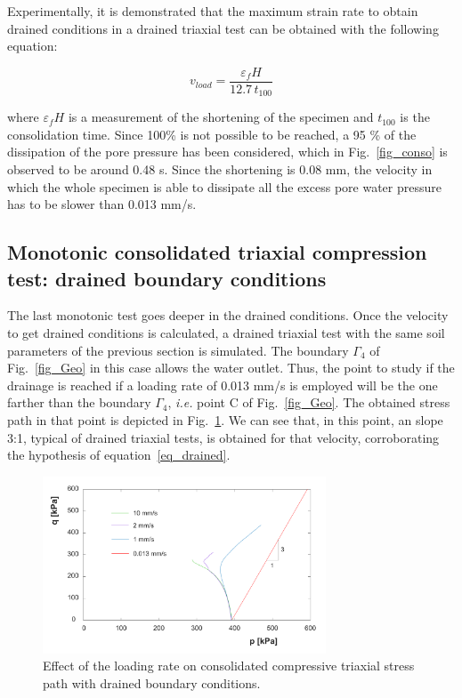 \documentclass[preprint,12pt,a4paper]{elsarticle}
\begin{document}
Experimentally, it is demonstrated that the maximum strain rate to obtain drained conditions in a drained triaxial test can be obtained with the following equation:

\begin{equation}
v_{load}=\frac{\varepsilon_f H}{12.7 \, t_{100}}
\end{equation}\label{eq_drained}

where $\varepsilon_f H$ is a measurement of the shortening of the specimen and $t_{100}$ is the consolidation time. Since 100\% is not possible to be reached, a 95 \% of the dissipation of the pore pressure has been considered, which in Fig.~\ref{fig_conso} is observed to be around 0.48 s. Since the shortening is 0.08 mm, the velocity in which the whole specimen is able to dissipate all the excess pore water pressure has to be slower than 0.013 mm/s.

\subsection{Monotonic consolidated triaxial compression test: drained boundary conditions}
\label{sec:33}
The last monotonic test goes deeper in the drained conditions. Once the velocity to get drained conditions is calculated, a drained triaxial test with the same soil parameters of the previous section is simulated. The boundary $\Gamma_4$ of Fig.~\ref{fig_Geo} in this case allows the water outlet. Thus, the point to study if the drainage is reached if a loading rate of 0.013 mm/s is employed will be the one farther than the boundary $\Gamma_4$, \textit{i.e.} point C of Fig.~\ref{fig_Geo}.  The obtained stress path in that point is depicted in Fig.~\ref{fig_pq_drained}. We can see that, in this point, an slope 3:1, typical of drained triaxial tests, is obtained for that velocity, corroborating the hypothesis of equation~\eqref{eq_drained}.

\begin{figure}
\centering
\includegraphics[width=0.75\textwidth]{Figs/pq_drained.pdf}
\caption{Effect of the loading rate on consolidated compressive triaxial stress path with drained boundary conditions.}
\label{fig_pq_drained}
\end{figure}
\end{document}
